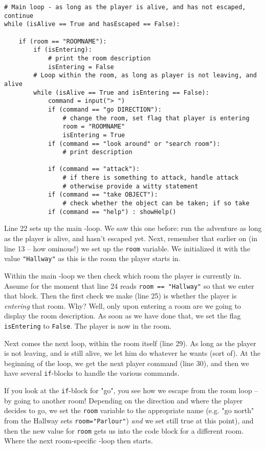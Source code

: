 \begin{lstlisting}[firstnumber=last]
# Main loop - as long as the player is alive, and has not escaped, continue
while (isAlive == True and hasEscaped == False):

    if (room == "ROOMNAME"):
        if (isEntering):
            # print the room description
            isEntering = False
        # Loop within the room, as long as player is not leaving, and alive    
        while (isAlive == True and isEntering == False):
            command = input("> ")
            if (command == "go DIRECTION"):
                # change the room, set flag that player is entering
                room = "ROOMNAME"
                isEntering = True
            if (command == "look around" or "search room"):
                # print description

            if (command == "attack"):
                # if there is something to attack, handle attack
                # otherwise provide a witty statement
            if (command == "take OBJECT"):
                # check whether the object can be taken; if so take
            if (command == "help") : showHelp()
\end{lstlisting}

Line 22 sets up the main \whileloop-loop. We saw this one before: run the adventure as long as the player is alive, and hasn't escaped yet. Next, remember that earlier on (in line 13 -- how ominous!) we set up the \texttt{room} variable. We initialized it with the value \texttt{"Hallway"} as this is the room the player starts in. 

Within the main \whileloop-loop we then check which room the player is currently in. Assume for the moment that line 24 reads \texttt{room == "Hallway"} so that we enter that block. Then the first check we make (line 25) is whether the player is \emph{entering} that room. Why? Well, only upon entering a room are we going to display the room description. As soon as we have done that, we set the flag \texttt{isEntering} to \texttt{False}. The player is now in the room. 

Next comes the next loop, within the room itself (line 29). As long as the player is not leaving, and is still alive, we let him do whatever he wants (sort of). At the beginning of the loop, we get the next player command (line 30), and then we have several \texttt{if}-blocks to handle the various commands. 

If you look at the \texttt{if}-block for "go", you see how we escape from the room loop -- by going to another room! Depending on the direction and where the player decides to go, we set the \texttt{room} variable to the appropriate name (e.g. "go north" from the Hallway sets \texttt{room="Parlour"}) \emph{and} we set still true at this point), and then the new value for \texttt{room} gets us into the code block for a different room. Where the next room-specific \whileloop-loop then starts.      





 
 













   